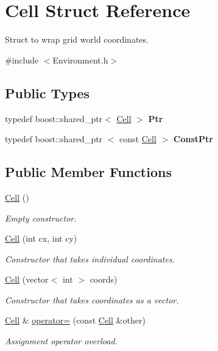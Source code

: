 \hypertarget{struct_cell}{\section{\-Cell \-Struct \-Reference}
\label{struct_cell}
}


\-Struct to wrap grid world coordinates.  




{\ttfamily \#include $<$\-Environment.\-h$>$}

\subsection*{\-Public \-Types}
\begin{DoxyCompactItemize}
\item 
\hypertarget{struct_cell_aad39d5dee4e425f0969cf18c606feff9}{typedef boost\-::shared\-\_\-ptr$<$ \hyperlink{struct_cell}{\-Cell} $>$ {\bfseries \-Ptr}}\label{struct_cell_aad39d5dee4e425f0969cf18c606feff9}

\item 
\hypertarget{struct_cell_a68e568cf815bfcf579f3df96721b030f}{typedef boost\-::shared\-\_\-ptr\*
$<$ const \hyperlink{struct_cell}{\-Cell} $>$ {\bfseries \-Const\-Ptr}}\label{struct_cell_a68e568cf815bfcf579f3df96721b030f}

\end{DoxyCompactItemize}
\subsection*{\-Public \-Member \-Functions}
\begin{DoxyCompactItemize}
\item 
\hyperlink{struct_cell_a394510643e8664cf12b5efaf5cb99f71}{\-Cell} ()
\begin{DoxyCompactList}\small\item\em \-Empty constructor. \end{DoxyCompactList}\item 
\hyperlink{struct_cell_a6d6d45beb3605fa91a4fde164ca1f2e7}{\-Cell} (int cx, int cy)
\begin{DoxyCompactList}\small\item\em \-Constructor that takes individual coordinates. \end{DoxyCompactList}\item 
\hyperlink{struct_cell_a26337b4abd24ec554fc4df0c20599fc3}{\-Cell} (vector$<$ int $>$ coords)
\begin{DoxyCompactList}\small\item\em \-Constructor that takes coordinates as a vector. \end{DoxyCompactList}\item 
\hyperlink{struct_cell}{\-Cell} \& \hyperlink{struct_cell_ac1c53fcae0c0be453d0312310ed80fc9}{operator=} (const \hyperlink{struct_cell}{\-Cell} \&other)
\begin{DoxyCompactList}\small\item\em \-Assignment operator overload. \end{DoxyCompactList}\end{DoxyCompactItemize}
